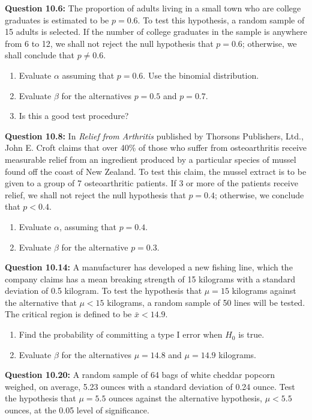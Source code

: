 \documentclass{article}
\begin{document}
\textbf{Question 10.6:}
The proportion of adults living in a small town
who are college graduates is estimated to be $p = 0.6$.
To test this hypothesis, a random sample of 15 adults
is selected. If the number of college graduates in the
sample is anywhere from 6 to 12, we shall not reject
the null hypothesis that $p = 0.6$; otherwise, we shall
conclude that $p \not= 0.6$.
\begin{enumerate}[label=(\alph*)]
    \item Evaluate $\alpha$ assuming that $p = 0.6$. Use the 
    binomial distribution.
    \item Evaluate $\beta$ for the alternatives $p = 0.5$ and 
    $p = 0.7$.
    \item Is this a good test procedure?
\end{enumerate}

\textbf{Question 10.8:}
In \textit{Relief from Arthritis} published by Thorsons
Publishers, Ltd., John E. Croft claims that over 40\%
of those who suffer from osteoarthritis receive 
measurable relief from an ingredient produced by a particular
species of mussel found off the coast of New Zealand.
To test this claim, the mussel extract is to be given to
a group of 7 osteoarthritic patients. If 3 or more of
the patients receive relief, we shall not reject the null
hypothesis that $p = 0.4$; otherwise, we conclude that
$p < 0.4$.
\begin{enumerate}[label=(\alph*)]
    \item Evaluate $\alpha$, assuming that $p = 0.4$.
    \item Evaluate $\beta$ for the alternative $p = 0.3$.
\end{enumerate}

\textbf{Question 10.14:}
A manufacturer has developed a new fishing
line, which the company claims has a mean breaking
strength of 15 kilograms with a standard deviation of
0.5 kilogram. To test the hypothesis that $\mu = 15$ 
kilograms against the alternative that $\mu < 15$ kilograms, a
random sample of 50 lines will be tested. The critical
region is defined to be $\bar{x} < 14.9$.
\begin{enumerate}[label=(\alph*)]
    \item Find the probability of committing a type I error
    when $H_0$ is true.
    \item Evaluate $\beta$ for the alternatives $\mu = 14.8$ and $\mu =
    14.9$ kilograms.
\end{enumerate}

\textbf{Question 10.20:}
A random sample of 64 bags of white cheddar 
popcorn weighed, on average, 5.23 ounces with a
standard deviation of 0.24 ounce. Test the hypothesis
that $\mu = 5.5$ ounces against the alternative hypothesis,
$\mu < 5.5$ ounces, at the 0.05 level of significance.
\newline
\end{document}

